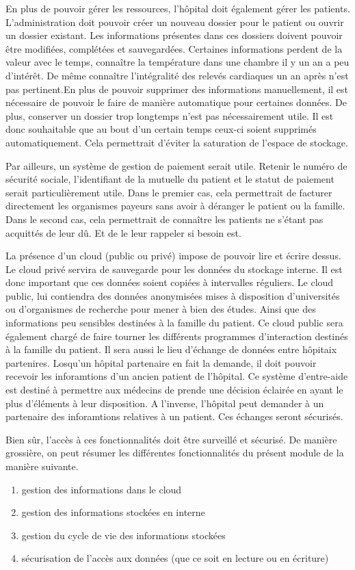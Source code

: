 En plus de pouvoir gérer les ressources, l'hôpital doit également gérer les patients. L'administration doit pouvoir créer un
nouveau dossier pour le patient ou ouvrir un dossier existant. Les informations présentes dans ces dossiers doivent pouvoir être
modifiées, complétées et sauvegardées. Certaines informations perdent de la valeur avec le temps, connaître la température dans
une chambre il y un an a peu d'intérêt. De même connaître l'intégralité des relevés cardiaques un an après n'est pas pertinent.En
plus de pouvoir supprimer des informations manuellement, il est nécessaire de pouvoir le faire de manière automatique pour
certaines données. De plus, conserver un dossier trop longtemps n'est pas nécessairement utile. Il est donc souhaitable que au
bout d'un certain temps ceux-ci soient supprimés automatiquement. Cela permettrait d'éviter la saturation de l'espace de stockage.
\newline

Par ailleurs, un système de gestion de paiement serait utile. Retenir le numéro de sécurité sociale, l'identifiant de la mutuelle
du patient et le statut de paiement serait particulièrement utile. Dans le premier cas, cela permettrait de facturer directement
les organismes payeurs sans avoir à déranger le patient ou la famille. Dans le second cas, cela permettrait de connaître les
patients ne s'étant pas acquittés de leur dû. Et de le leur rappeler si besoin est.
\newline

La présence d'un cloud (public ou privé) impose de pouvoir lire et écrire dessus. Le cloud privé servira de sauvegarde pour les
données du stockage interne. Il est donc important que ces données soient copiées à intervalles réguliers. Le cloud public, lui
contiendra des données anonymisées mises à disposition d'universités ou d'organismes de recherche pour mener à bien des études.
Ainsi que des informations peu sensibles destinées à la famille du patient. Ce cloud public sera également chargé de faire tourner
les différents programmes d'interaction destinés à la famille du patient. Il sera aussi le lieu d'échange de données entre
hôpitaix partenires. Losqu'un hôpital partenaire en fait la demande, il doit pouvoir recevoir les inforamtions d'un ancien patient
de l'hôpital. Ce système d'entre-aide est destiné à permettre aux médecins de prende une décision éclairée en ayant le plus
d'éléments à leur disposition. A l'inverse, l'hôpital peut demander à un partenaire des inforamtions relatives à un patient. Ces
échanges seront sécurisés.
\newline

Bien sûr, l'accès à ces fonctionnalités doit être surveillé et sécurisé. De manière grossière, on peut résumer les différentes
fonctionnalités du présent module de la manière suivante.
\begin{enumerate}
    \item gestion des informations dans le cloud
    \item gestion des informations stockées en interne
    \item gestion du cycle de vie des informations stockées
    \item sécurisation de l'accès aux données (que ce soit en lecture ou en écriture)
\end{enumerate}
